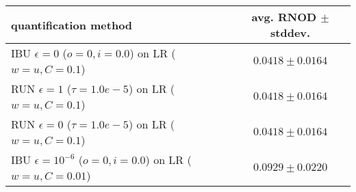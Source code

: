 \begin{tabular}{lc}
  \toprule
  quantification method & avg. RNOD $\pm$ stddev. \\
  \midrule
  IBU $\epsilon=0$ ($o=0, i=0.0$) on LR ($w=u, C=0.1$) & $\mathbf{0.0418 \pm 0.0164}$ \\
  RUN $\epsilon=1$ ($\tau=1.0e-5$) on LR ($w=u, C=0.1$) & $\mathbf{0.0418 \pm 0.0164}$ \\
  RUN $\epsilon=0$ ($\tau=1.0e-5$) on LR ($w=u, C=0.1$) & $\mathbf{0.0418 \pm 0.0164}$ \\
  IBU $\epsilon=10^{-6}$ ($o=0, i=0.0$) on LR ($w=u, C=0.01$) & $0.0929 \pm 0.0220$ \\
  \bottomrule
\end{tabular}

